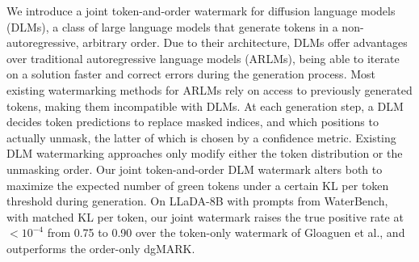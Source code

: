 \begingroup
{}
\fontsize{11}{13}\selectfont
We introduce a joint token-and-order watermark for diffusion language models (DLMs),
a class of large language models that generate tokens in a non-autoregressive, arbitrary order.
Due to their architecture, DLMs offer advantages over traditional autoregressive language models (ARLMs),
being able to iterate on a solution faster and correct errors during the generation process. Most existing
watermarking methods for ARLMs rely on access to previously generated tokens, making them incompatible with DLMs.
At each generation step, a DLM decides token predictions to replace masked indices, and which positions to actually unmask, the latter
of which is chosen by a confidence metric. Existing DLM watermarking approaches only modify either the token distribution
or the unmasking order. Our joint token-and-order DLM watermark alters both to maximize the expected number of green tokens under a
certain KL per token threshold during generation. On LLaDA-8B with prompts from WaterBench, with matched KL per token, our joint watermark
raises the true positive rate at $<10^{-4}$ from 0.75 to 0.90 over the token-only watermark of Gloaguen et al., and outperforms the order-only dgMARK.


\endgroup



